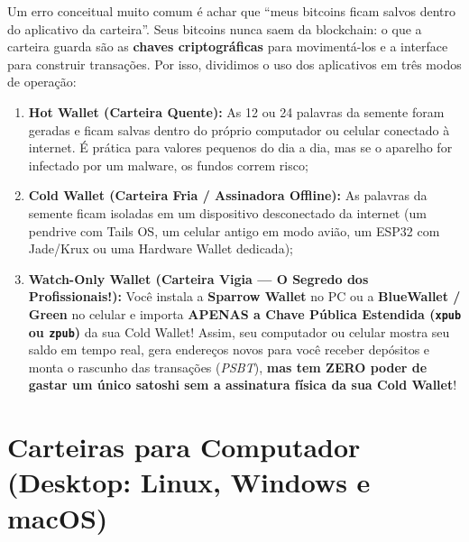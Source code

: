 \documentclass{pousadaguide}
\begin{document}
Um erro conceitual muito comum é achar que ``meus bitcoins ficam salvos dentro do aplicativo da carteira''. Seus bitcoins nunca saem da blockchain: o que a carteira guarda são as \textbf{chaves criptográficas} para movimentá-los e a interface para construir transações. Por isso, dividimos o uso dos aplicativos em três modos de operação:

\begin{enumerate}
  \item \textbf{Hot Wallet (Carteira Quente):} As 12 ou 24 palavras da semente foram geradas e ficam salvas dentro do próprio computador ou celular conectado à internet. É prática para valores pequenos do dia a dia, mas se o aparelho for infectado por um malware, os fundos correm risco;
  \item \textbf{Cold Wallet (Carteira Fria / Assinadora Offline):} As palavras da semente ficam isoladas em um dispositivo desconectado da internet (um pendrive com Tails OS, um celular antigo em modo avião, um ESP32 com Jade/Krux ou uma Hardware Wallet dedicada);
  \item \textbf{Watch-Only Wallet (Carteira Vigia — O Segredo dos Profissionais!):} Você instala a \textbf{Sparrow Wallet} no PC ou a \textbf{BlueWallet / Green} no celular e importa \textbf{APENAS a Chave Pública Estendida (\texttt{xpub} ou \texttt{zpub})} da sua Cold Wallet! Assim, seu computador ou celular mostra seu saldo em tempo real, gera endereços novos para você receber depósitos e monta o rascunho das transações (\emph{PSBT}), \textbf{mas tem ZERO poder de gastar um único satoshi sem a assinatura física da sua Cold Wallet}!
\end{enumerate}

\clearpage
\section{Carteiras para Computador (Desktop: Linux, Windows e macOS)}
\end{document}
